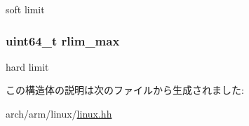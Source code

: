 soft limit \hypertarget{structArmLinux64_1_1rlimit_af8e4fdfd658610e9b762fb606dce339a}{
\subsubsection[{rlim\_\-max}]{\setlength{\rightskip}{0pt plus 5cm}uint64\_\-t {\bf rlim\_\-max}}}
\label{structArmLinux64_1_1rlimit_af8e4fdfd658610e9b762fb606dce339a}


hard limit 

この構造体の説明は次のファイルから生成されました:\begin{DoxyCompactItemize}
\item 
arch/arm/linux/\hyperlink{arch_2arm_2linux_2linux_8hh}{linux.hh}\end{DoxyCompactItemize}
